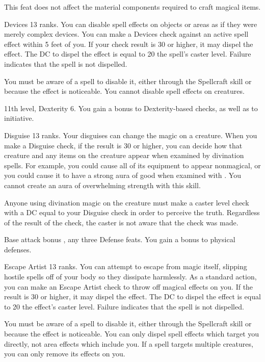 This feat does not affect the material components required to craft magical items.

\featpre Devices 13 ranks.
\featben You can disable spell effects on objects or areas as if they were merely complex devices. You can make a Devices check against an active spell effect within 5 feet of you. If your check result is 30 or higher, it may dispel the effect. The DC to dispel the effect is equal to 20 \add the spell's caster level. Failure indicates that the spell is not dispelled.

You must be aware of a spell to disable it, either through the Spellcraft skill or because the effect is noticeable. You cannot disable spell effects on creatures.

\featpre 11th level, Dexterity 6.
\featben You gain a  bonus to Dexterity-based checks, as well as to initiative.

\featpre Disguise 13 ranks.
\featben Your disguises can change the magic on a creature. When you make a Disguise check, if the result is 30 or higher, you can decide how that creature and any items on the creature appear when examined by divination spells. For example, you could cause all of its equipment to appear nonmagical, or you could cause it to have a strong aura of good when examined with . You cannot create an aura of overwhelming strength with this skill.

Anyone using divination magic on the creature must make a caster level check with a DC equal to your Disguise check in order to perceive the truth. Regardless of the result of the check, the caster is not aware that the check was made.

\featpre Base attack bonus , any three Defense feats.
\featben You gain a  bonus to physical defenses.

\featpre Escape Artist 13 ranks.
\featben You can attempt to escape from magic itself, slipping hostile spells off of your body so they dissipate harmlessly. As a standard action, you can make an Escape Artist check to throw off magical effects on you. If the result is 30 or higher, it may dispel the effect. The DC to dispel the effect is equal to 20 \add the effect's caster level. Failure indicates that the spell is not dispelled.

You must be aware of a spell to disable it, either through the Spellcraft skill or because the effect is noticeable. You can only dispel spell effects which target you directly, not area effects which include you. If a spell targets multiple creatures, you can only remove its effects on you.

